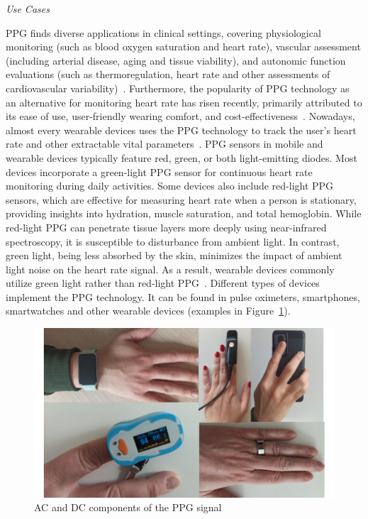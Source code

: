 \vspace{0.2cm}
\textit{Use Cases}
\vspace{0.2cm}

PPG finds diverse applications in clinical settings, covering physiological monitoring (such as blood oxygen saturation and heart rate), vascular assessment (including arterial disease, aging and tissue viability), and autonomic function evaluations (such as thermoregulation, heart rate and other assessments of cardiovascular variability)~\cite{allenPhotoplethysmographyItsApplication2007a}.
Furthermore, the popularity of PPG technology as an alternative for monitoring heart rate has risen recently, primarily attributed to its ease of use, user-friendly wearing comfort, and cost-effectiveness~\cite{sviridovaHumanPhotoplethysmogramNew2015}.
Nowadays, almost every wearable devices uses the PPG technology to track the user's heart rate and other extractable vital parameters~\cite{castanedaReviewWearablePhotoplethysmography2018}.
PPG sensors in mobile and wearable devices typically feature red, green, or both light-emitting diodes.
Most devices incorporate a green-light PPG sensor for continuous heart rate monitoring during daily activities.
Some devices also include red-light PPG sensors, which are effective for measuring heart rate when a person is stationary, providing insights into hydration, muscle saturation, and total hemoglobin.
While red-light PPG can penetrate tissue layers more deeply using near-infrared spectroscopy, it is susceptible to disturbance from ambient light.
In contrast, green light, being less absorbed by the skin, minimizes the impact of ambient light noise on the heart rate signal.
As a result, wearable devices commonly utilize green light rather than red-light PPG~\cite{ponnadaTechnologicalConsiderationsSensorassisted2019}.
Different types of devices implement the PPG technology.
It can be found in pulse oximeters, smartphones, smartwatches and other wearable devices (examples in Figure~\ref{fig:ppg-devices}).

\begin{figure}[h]
    \centering
    \includegraphics[scale=0.35]{images/ppg/ppg-devices}
    \caption{AC and DC components of the PPG signal \cite{zanelliPotentialAIBased2023}}
    \label{fig:ppg-devices}
\end{figure}

